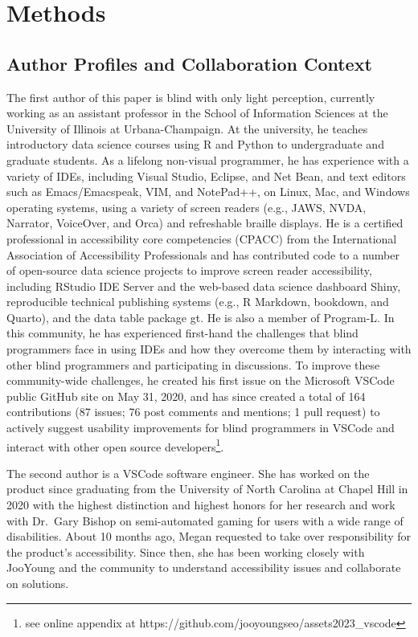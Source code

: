 \documentclass[sigconf]{acmart}
\begin{document}
\hypertarget{methods}{%
\section{Methods}\label{methods}}

\hypertarget{author-profiles-and-collaboration-context}{%
\subsection{Author Profiles and Collaboration
Context}\label{author-profiles-and-collaboration-context}}

The first author of this paper is blind with only light perception,
currently working as an assistant professor in the School of Information
Sciences at the University of Illinois at Urbana-Champaign. At the
university, he teaches introductory data science courses using R and
Python to undergraduate and graduate students. As a lifelong non-visual
programmer, he has experience with a variety of IDEs, including Visual
Studio, Eclipse, and Net Bean, and text editors such as Emacs/Emacspeak,
VIM, and NotePad++, on Linux, Mac, and Windows operating systems, using
a variety of screen readers (e.g., JAWS, NVDA, Narrator, VoiceOver, and
Orca) and refreshable braille displays. He is a certified professional
in accessibility core competencies (CPACC) from the International
Association of Accessibility Professionals and has contributed code to a
number of open-source data science projects to improve screen reader
accessibility, including RStudio IDE Server and the web-based data
science dashboard Shiny, reproducible technical publishing systems
(e.g., R Markdown, bookdown, and Quarto), and the data table package gt.
He is also a member of Program-L. In this community, he has experienced
first-hand the challenges that blind programmers face in using IDEs and
how they overcome them by interacting with other blind programmers and
participating in discussions. To improve these community-wide
challenges, he created his first issue on the Microsoft VSCode public
GitHub site on May 31, 2020, and has since created a total of 164
contributions (87 issues; 76 post comments and mentions; 1 pull request)
to actively suggest usability improvements for blind programmers in
VSCode and interact with other open source developers\footnote{see
  online appendix at https://github.com/jooyoungseo/assets2023\_vscode}.

The second author is a VSCode software engineer. She has worked on the
product since graduating from the University of North Carolina at Chapel
Hill in 2020 with the highest distinction and highest honors for her
research and work with Dr.~Gary Bishop on semi-automated gaming for
users with a wide range of disabilities. About 10 months ago, Megan
requested to take over responsibility for the product's accessibility.
Since then, she has been working closely with JooYoung and the community
to understand accessibility issues and collaborate on solutions.
\end{document}
